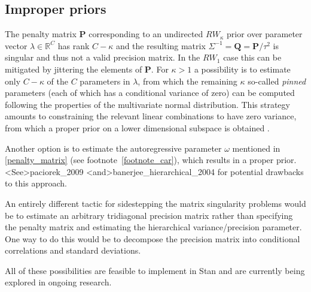 \clearpage
\label{AppendixA}
\vspace{-1.75cm}
\subsection{Improper priors}

The penalty matrix $\mathbf{P}$ corresponding to an undirected $RW_\kappa$ prior over 
parameter vector $\lambda \in \mathbb{R}^C$ has rank $C - \kappa$ and the resulting 
matrix $\Sigma^{-1} = \mathbf{Q} = \mathbf{P}/\tau^2$ is singular and thus not a valid precision 
matrix. In the $RW_1$ case this can be mitigated by jittering the elements of $\mathbf{P}$. 
For $\kappa > 1$ a possibility is to estimate only $C - \kappa$ of the $C$ parameters in $\lambda$,  
from which the remaining $\kappa$ so-called {\it pinned} parameters (each of which has a 
conditional variance of zero) can be computed following the properties of the multivariate 
normal distribution. This strategy amounts to  constraining the relevant linear combinations 
to have zero variance, from which a proper prior on a lower dimensional subspace is 
obtained . 

Another option is to estimate the autoregressive parameter $\omega$ mentioned 
in \ref{penalty_matrix} (see footnote~\ref{footnote_car}), which results in a proper prior.
\citeA<See>{paciorek_2009} \citeA<and>{banerjee_hierarchical_2004} for potential
drawbacks to this approach.

An entirely different tactic for sidestepping the matrix singularity problems would be 
to estimate an arbitrary tridiagonal precision matrix rather than specifying the penalty 
matrix and estimating the hierarchical variance/precision parameter. One way to do this 
would be to decompose the precision matrix into conditional correlations and 
standard deviations. 

All of these possibilities are feasible to implement in Stan and are currently 
being explored in ongoing research.  




